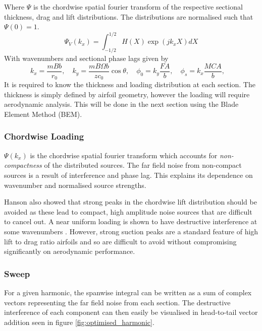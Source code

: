 \documentclass{article}
\begin{document}
Where $\Psi$ is the chordwise spatial fourier transform of the respective sectional thickness, drag and lift distributions.
The distributions are normalised such that $\Psi(0) = 1$.
\begin{equation}
    \Psi_V(k_x) = \int_{-1/2}^{1/2} H(X) \exp(jk_x X) dX
\end{equation}
With wavenumbers and sectional phase lags given by
\begin{equation}
    k_x = \frac{mB b}{r_0}, \quad
    k_y = \frac{mB\Omega b}{z c_0} \cos \theta, \quad
    \phi_0 = k_y \frac{FA}{b}, \quad
    \phi_s = k_x \frac{MCA}{b}, \quad
\end{equation}
It is required to know the thickness and loading distribution at each section.
The thickness is simply defined by airfoil geometry, however the loading will require aerodynamic analysis.
This will be done in the next section using the Blade Element Method (BEM).
\subsubsection{Chordwise Loading}
$\Psi(k_x)$ is the chordwise spatial fourier transform which accounts for \textit{non-compactness} of the distributed sources.
The far field noise from non-compact sources is a result of interference and phase lag. 
This explains its dependence on wavenumber and normalised source strengths.

Hanson also showed that strong peaks in the chordwise lift distribution should be avoided
as these lead to compact, high amplitude noise sources that are difficult to cancel out.
A near uniform loading is shown to have destructive interference at some wavenumbers \cite{hanson_influence}.
However, strong suction peaks are a standard feature of high lift to drag ratio airfoils \cite{?}
and so are difficult to avoid without compromising significantly on aerodynamic performance.
\subsubsection{Sweep}
For a given harmonic, the spanwise integral can be written as a sum of complex vectors representing the far field noise from each section.
The destructive interference of each component can then easily be visualised in head-to-tail vector addition seen in figure \ref{fig:optimised_harmonic}.
\end{document}
